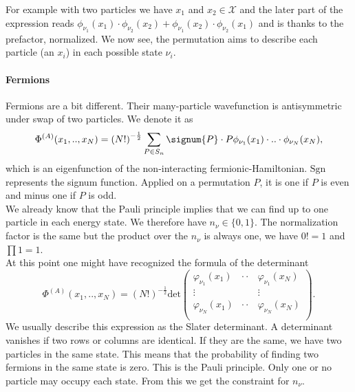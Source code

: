 \documentclass[../main.tex]{subfile}
\begin{document}
For example with two particles we have $x_1$ and $x_2\in\mathcal{X}$ and the later part of the expression reads 
$\phi_{\nu_1}(x_1) \cdot \phi_{\nu_2}(x_2) + \phi_{\nu_1}(x_2) \cdot \phi_{\nu_2}(x_1)$ and is thanks to the prefactor, normalized.
We now see, the permutation aims to describe each particle (an $x_i$) in each possible state $\nu_i$.

\paragraph{Fermions}$~$\\

Fermions are a bit different. Their many-particle wavefunction is antisymmetric under swap of two particles. We denote it as
\[
    \Phi^{(A)}(x_1,..,x_N) = \left(N!\right)^{-\frac{1}{2}} \sum_{P\in S_n} \signum{P}\cdot P \phi_{\nu_1}(x_1)\cdot ..\cdot \phi_{\nu_N}(x_N),
\]
which is an eigenfunction of the non-interacting fermionic-Hamiltonian.
$\text{Sgn}$ represents the signum function. Applied on a permutation $P$, it is one if $P$ is even and minus one if $P$ is odd.\\
We already know that the Pauli principle implies that we can find up to one particle in each energy state. We therefore have $n_\nu \in \{0,1\}$. The normalization
factor is the same but the product over the $n_{\nu}$ is always one, we have $0!=1$ and $\prod 1 = 1$.  \\

At this point one might have recognized the formula of the determinant
\[
    \Phi^{(A)}(x_1,..,x_N) = \left(N!\right)^{-\frac{1}{2}} \text{det}\begin{pmatrix}
        \varphi_{\nu_1}(x_1)& \cdot\cdot &\varphi_{\nu_1}(x_N)\\
        \vdots&  &\vdots\\
        \varphi_{\nu_N}(x_1)& \cdot\cdot &\varphi_{\nu_N}(x_N)\\

    \end{pmatrix}.
\]
We usually describe this expression as the Slater determinant. A determinant vanishes if two rows or columns are identical. If they are the same, we have two particles 
in the same state. This means that the probability of finding two fermions in the same state is zero.
This is the Pauli principle. Only one or no particle may occupy each state. From this we get the constraint for $n_{\nu}$.\\
\end{document}
